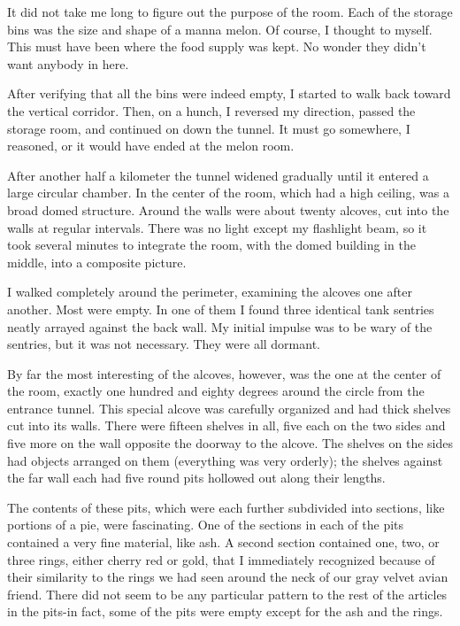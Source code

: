 \documentclass[]{article}
\begin{document}
It did not take me long to figure out the purpose of the room.  Each of the storage bins was the size and shape of a manna melon.  Of course, I thought to myself.  This must have been where the food supply was kept.  No wonder they didn’t want anybody in here.

After verifying that all the bins were indeed empty, I started to walk back toward the vertical corridor.  Then, on a hunch, I reversed my direction, passed the storage room, and continued on down the tunnel.  It must go somewhere, I reasoned, or it would have ended at the melon room.

After another half a kilometer the tunnel widened gradually until it entered a large circular chamber.  In the center of the room, which had a high ceiling, was a broad domed structure.  Around the walls were about twenty alcoves, cut into the walls at regular intervals.  There was no light except my flashlight beam, so it took several minutes to integrate the room, with the domed building in the middle, into a composite picture.

I walked completely around the perimeter, examining the alcoves one after another.  Most were empty.  In one of them I found three identical tank sentries neatly arrayed against the back wall.  My initial impulse was to be wary of the sentries, but it was not necessary.  They were all dormant.

By far the most interesting of the alcoves, however, was the one at the center of the room, exactly one hundred and eighty degrees around the circle from the entrance tunnel.  This special alcove was carefully organized and had thick shelves cut into its walls.  There were fifteen shelves in all, five each on the two sides and five more on the wall opposite the doorway to the alcove.  The shelves on the sides had objects arranged on them (everything was very orderly); the shelves against the far wall each had five round pits hollowed out along their lengths.

The contents of these pits, which were each further subdivided into sections, like portions of a pie, were fascinating.  One of the sections in each of the pits contained a very fine material, like ash.  A second section contained one, two, or three rings, either cherry red or gold, that I immediately recognized because of their similarity to the rings we had seen around the neck of our gray velvet avian friend.  There did not seem to be any particular pattern to the rest of the articles in the pits-in fact, some of the pits were empty except for the ash and the rings.
\end{document}
